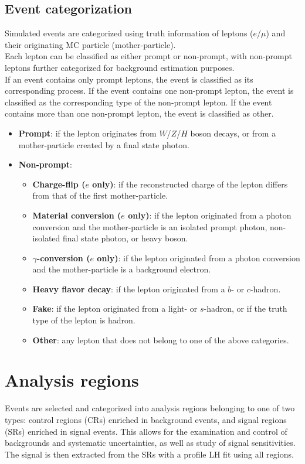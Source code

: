 \documentclass[../thesis.tex]{subfiles}
\begin{document}
\subsection{Event categorization}
Simulated events are categorized using truth information of leptons ($e$/$\mu$) and their originating MC particle (mother-particle).\\
Each lepton can be classified as either prompt or non-prompt, with non-prompt leptons further categorized for background estimation purposes.\\
If an event contains only prompt leptons, the event is classified as its corresponding process. If the event contains one non-prompt lepton, the event is classified as the corresponding type of the non-prompt lepton. If the event contains more than one non-prompt lepton, the event is classified as other.
\begin{itemize}
\item \textbf{Prompt}: if the lepton originates from $W$/$Z$/$H$ boson decays, or from a mother-particle created by a final state photon.
\item \textbf{Non-prompt}:
	\begin{itemize}
	\item \textbf{Charge-flip ($e$ only)}: if the reconstructed charge of the lepton differs from that of the first mother-particle.
	\item \textbf{Material conversion ($e$ only)}: if the lepton originated from a photon conversion and the mother-particle is an isolated prompt photon, non-isolated final state photon, or heavy boson.
	\item \textbf{$\gamma$-conversion ($e$ only)}: if the lepton originated from a photon conversion and the mother-particle is a background electron.
	\item \textbf{Heavy flavor decay}: if the lepton originated from a $b$- or $c$-hadron.
	\item \textbf{Fake}: if the lepton originated from a light- or $s$-hadron, or if the truth type of the lepton is hadron.
	\item \textbf{Other}: any lepton that does not belong to one of the above categories.
	\end{itemize}
\end{itemize}

\section{Analysis regions}
\label{sec:ana}
Events are selected and categorized into analysis regions belonging to one of two types: control regions (CRs) enriched in background events, and signal regions (SRs) enriched in signal events. This allows for the examination and control of backgrounds and systematic uncertainties, as well as study of signal sensitivities.\\
The signal is then extracted from the SRs with a profile LH fit using all regions.
\end{document}
